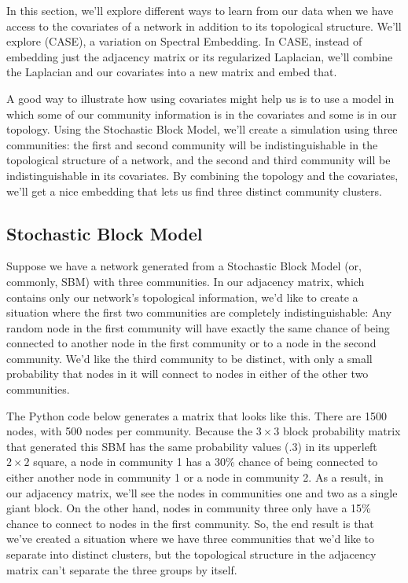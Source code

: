 \documentclass[letterpaper,10pt,english]{jupyterBook}
\begin{document}
\sphinxAtStartPar
In this section, we’ll explore different ways to learn from our data when we have access to the covariates of a network in addition to its topological structure. We’ll explore  (CASE), a variation on Spectral Embedding. In CASE, instead of embedding just the adjacency matrix or its regularized Laplacian, we’ll combine the Laplacian and our covariates into a new matrix and embed that.

\sphinxAtStartPar
A good way to illustrate how using covariates might help us is to use a model in which some of our community information is in the covariates and some is in our topology. Using the Stochastic Block Model, we’ll create a simulation using three communities: the first and second community will be indistinguishable in the topological structure of a network, and the second and third community will be indistinguishable in its covariates. By combining the topology and the covariates, we’ll get a nice embedding that lets us find three distinct community clusters.


\subsection{Stochastic Block Model}
\label{\detokenize{representations/ch6/joint-representation-learning:stochastic-block-model}}
\sphinxAtStartPar
Suppose we have a network generated from a Stochastic Block Model (or, commonly, SBM) with three communities. In our adjacency matrix, which contains only our network’s topological information, we’d like to create a situation where the first two communities are completely indistinguishable: Any random node in the first community will have exactly the same chance of being connected to another node in the first community or to a node in the second community. We’d like the third community to be distinct, with only a small probability that nodes in it will connect to nodes in either of the other two communities.

\sphinxAtStartPar
The Python code below generates a matrix that looks like this. There are 1500 nodes, with 500 nodes per community. Because the \(3 \times 3\) block probability matrix that generated this SBM has the same probability values (.3) in its upper\sphinxhyphen{}left \(2 \times 2\) square, a node in community 1 has a 30\% chance of being connected to either another node in community 1 or a node in community 2. As a result, in our adjacency matrix, we’ll see the nodes in communities one and two as a single giant block. On the other hand, nodes in community three only have a 15\% chance to connect to nodes in the first community. So, the end result is that we’ve created a situation where we have three communities that we’d like to separate into distinct clusters, but the topological structure in the adjacency matrix can’t separate the three groups by itself.
\end{document}
